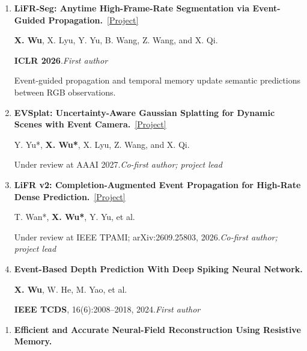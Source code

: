 \documentclass[a4paper]{article}
\newcommand{\pubgroup}[1]{%
  \par\vspace{2.0pt}{\color{cvblue}\fontsize{9.4}{10.4}\selectfont\bfseries #1}\par
}
\newcommand{\pubnote}[1]{\par{\color{cvgray}#1}}
\begin{document}
{\begin{enumerate}[leftmargin=1.6em,labelsep=0.38em,itemsep=0.4pt,topsep=1.3pt,parsep=0pt,partopsep=0pt]
\textbf{X. Wu}, Y. Yu, X. Lyu, et al.\par
\textbf{NeurIPS 2025} \textcolor{cvred}{\textbf{\textperiodcentered\ Spotlight}}.\hfill\textcolor{cvblue}{\textit{First author}}
\pubnote{Reliability-aware RGB--event fusion and photometric constraints recover geometry in dynamic, low-light scenes.}
\item \textbf{LiFR-Seg: Anytime High-Frame-Rate Segmentation via Event-Guided Propagation.}~\href{https://candy-crusher.github.io/xiaoshanwu.github.io/projects/lifr-seg/}{\textcolor{cvblue}{[Project]}}\par
\textbf{X. Wu}, X. Lyu, Y. Yu, B. Wang, Z. Wang, and X. Qi.\par
\textbf{ICLR 2026}.\hfill\textcolor{cvblue}{\textit{First author}}
\pubnote{Event-guided propagation and temporal memory update semantic predictions between RGB observations.}
\item \textbf{EVSplat: Uncertainty-Aware Gaussian Splatting for Dynamic Scenes with Event Camera.}~\href{https://candy-crusher.github.io/xiaoshanwu.github.io/projects/evsplat/}{\textcolor{cvblue}{[Project]}}\par
Y. Yu*, \textbf{X. Wu*\textdagger}, X. Lyu, Z. Wang, and X. Qi.\par
Under review at AAAI 2027.\hfill\textcolor{cvblue}{\textit{Co-first author; project lead}}
\item \textbf{LiFR v2: Completion-Augmented Event Propagation for High-Rate Dense Prediction.}~\href{https://candy-crusher.github.io/xiaoshanwu.github.io/projects/lifr-v2/}{\textcolor{cvblue}{[Project]}}\par
T. Wan*, \textbf{X. Wu*\textdagger}, Y. Yu, et al.\par
Under review at IEEE TPAMI; arXiv:2609.25803, 2026.\hfill\textcolor{cvblue}{\textit{Co-first author; project lead}}
\item \textbf{Event-Based Depth Prediction With Deep Spiking Neural Network.}\par
\textbf{X. Wu}, W. He, M. Yao, et al.\par
\textbf{IEEE TCDS}, 16(6):2008--2018, 2024.\hfill\textcolor{cvblue}{\textit{First author}}
\end{enumerate}
\pubgroup{Collaborative Work}
\begin{enumerate}[resume,leftmargin=1.6em,labelsep=0.38em,itemsep=0.4pt,topsep=1.3pt,parsep=0pt,partopsep=0pt]
\item \textbf{Efficient and Accurate Neural-Field Reconstruction Using Resistive Memory.}\par

\end{enumerate}}
\end{document}

